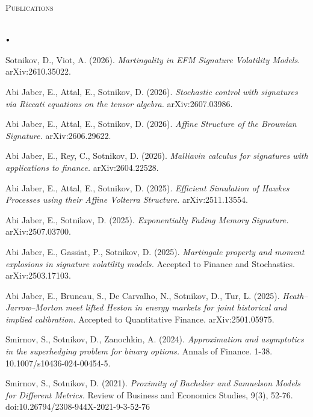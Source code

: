 \documentclass[11pt]{article}
\newcommand{\lineunder}{\vspace*{-8pt} \\ \hspace*{-18pt} \hrulefill \\}
\newcommand{\header}[1]{{\hspace*{-15pt}\vspace*{6pt} \textsc{#1}} \vspace*{-6pt} \lineunder}
\newcommand{\lbt}{\,\begin{picture}(-1,1)(-1,-3)\circle*{3}\end{picture}\ }
\newenvironment{achievements}{
    \begin{list}{$\lbt$}{
        \topsep 0pt
        \itemsep 0pt
        \addtolength{\leftmargin}{-0.1in}
    }
}
{
    \vspace*{4pt}
    \end{list}
}
\begin{document}
\header{Publications}
\vspace{2mm}
\begin{achievements}
\item Sotnikov, D., Viot, A. (2026). \textit{Martingality in EFM Signature Volatility Models.} arXiv:2610.35022.
\item Abi Jaber, E., Attal, E., Sotnikov, D. (2026). \textit{Stochastic control with signatures via Riccati equations on the tensor algebra.} arXiv:2607.03986.
\item Abi Jaber, E., Attal, E., Sotnikov, D. (2026). \textit{Affine Structure of the Brownian Signature.} arXiv:2606.29622.
\item Abi Jaber, E., Rey, C., Sotnikov, D. (2026). \textit{Malliavin calculus for signatures with applications to finance.} arXiv:2604.22528.
\item Abi Jaber, E., Attal, E., Sotnikov, D. (2025). \textit{Efficient Simulation of Hawkes Processes using their Affine Volterra Structure.} arXiv:2511.13554.
\item Abi Jaber, E., Sotnikov, D. (2025). \textit{Exponentially Fading Memory Signature.} arXiv:2507.03700.
\item Abi Jaber, E., Gassiat, P., Sotnikov, D. (2025). \textit{Martingale property and moment explosions in signature volatility models.} Accepted to Finance and Stochastics. arXiv:2503.17103.
\item Abi Jaber, E., Bruneau, S., De Carvalho, N., Sotnikov, D., Tur, L. (2025). \textit{Heath--Jarrow--Morton meet lifted Heston in energy markets for joint historical and implied calibration.} Accepted to Quantitative Finance. arXiv:2501.05975.
\item Smirnov, S., Sotnikov, D., Zanochkin, A. (2024). \textit{Approximation and asymptotics in the superhedging problem for binary options.} Annals of Finance. 1-38. 10.1007/s10436-024-00454-5. 
\item Smirnov, S., Sotnikov, D. (2021). \textit{Proximity of Bachelier and Samuelson Models for Different Metrics.}
Review of Business and Economics Studies, 9(3), 52-76. doi:10.26794/2308-944X-2021-9-3-52-76
\end{achievements}
\end{document}
